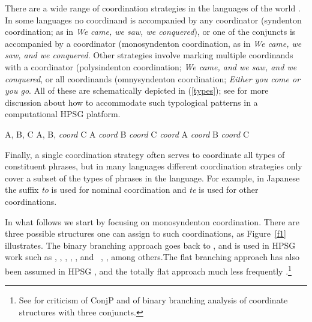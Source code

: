 {There are a wide range of coordination strategies in the languages of the world \citep{haspelmath}. In some languages no coordinand is accompanied by any coordinator (syndenton coordination; as in \emph{We came, we saw, we conquered}), or one of the conjuncts is accompanied by a coordinator (monosyndenton coordination,  as in \emph{We came, we saw, and we conquered}. Other strategies involve marking multiple coordinands with a coordinator (polysindenton coordination;
\emph{We came, and we saw, and we conquered}, or all coordinands (omnysyndenton coordination;
\emph{Either you come or you go}.
All of these are schematically depicted in (\ref{types}); see
 \citet{Drellishak:Bender:05} for more discussion about how to accommodate such typological patterns in a computational HPSG platform.

\eal
\label{types}
\settowidth{}
\ex A, B, C 
\ex A, B, \emph{coord} C 
\ex A \emph{coord} B \emph{coord} C 
\ex \emph{coord} A \emph{coord} B \emph{coord} C 
\zl


\noindent
 Finally, a single coordination strategy often serves to coordinate all types of constituent phrases, but in many languages different coordination strategies only cover a subset of the types of phrases in the language. For example, in
Japanese the suffix \emph{to} is used for nominal coordination
and \emph{te} is used for other coordinations.

In what follows we start by focusing on monosyndenton coordination. There are three possible structures one can assign to such coordinations, as Figure~\ref{f1} illustrates. The binary branching approach goes back to \citet{yngve}, and is used in HPSG work such as
\citet{pollardsag}, \citet{Yatabe:03}, \citet{berthold03},
\citet{Beavers}, \citet{Drellishak:Bender:05},  and
\ \citet{chavesthesis}, \citet{chavesextr}, among others.\addpages The flat branching approach has also been  assumed in HPSG
\citep{Abeille:05,Abeille06,Mouret:05,Mouret:06,Bilbiie:17}, and the totally flat approach much less frequently  \citep{sagwasowbender,Sag:03}.\footnote{See \citet{Borsley2005a} for criticism of 
ConjP and of binary branching analysis of coordinate structures with three conjuncts.}

}
